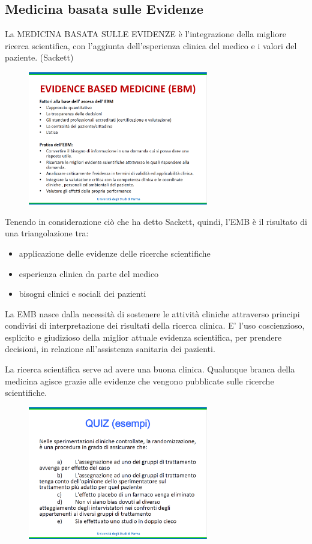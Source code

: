 \subsection{Medicina basata sulle Evidenze}

La MEDICINA BASATA SULLE EVIDENZE è l'integrazione della migliore ricerca scientifica, con l'aggiunta dell'esperienza clinica del medico e i valori del paziente. (Sackett)

\begin{figure}[!ht]
\centering
\includegraphics[width=0.7\textwidth]{05/image2.png}
\end{figure}

Tenendo in considerazione ciò che ha detto Sackett, quindi, l'EMB è il risultato di una triangolazione tra:

\begin{itemize}
\item
  applicazione delle evidenze delle ricerche scientifiche
\item
  esperienza clinica da parte del medico
\item
  bisogni clinici e sociali dei pazienti
\end{itemize}

La EMB nasce dalla necessità di sostenere le attività cliniche attraverso principi condivisi di interpretazione dei risultati della ricerca clinica. E' l'uso coscienzioso, esplicito e giudizioso della miglior attuale evidenza scientifica, per prendere decisioni, in relazione all'assistenza sanitaria dei pazienti.

La ricerca scientifica serve ad avere una buona clinica. Qualunque branca della medicina agisce grazie alle evidenze che vengono pubblicate sulle ricerche scientifiche.

\begin{figure}[!ht]
\centering
\includegraphics[width=0.7\textwidth]{05/image3.png}
\end{figure}

